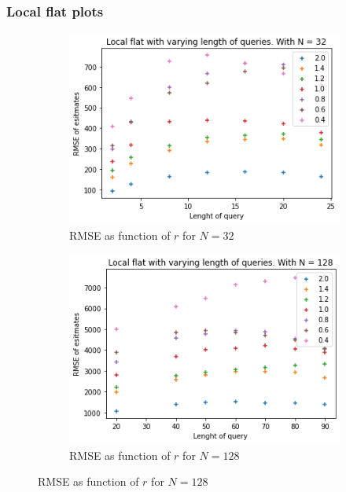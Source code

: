 \documentclass[11pt]{article}
\theoremstyle{definition}
\begin{document}
\subsubsection{Local flat plots}\label{app:loc_r}
\begin{figure}[H]
\centering
\begin{subfigure}{.4\textwidth}
  \centering
  \includegraphics[width=\linewidth]{figures/local_flat/varying_r/loc_flat_varying_length_N=32.png}
  \caption{RMSE as function of $r$ for $N=32$}
  \label{fig:a}
\end{subfigure}%
\begin{subfigure}{.4\textwidth}
  \centering
  \includegraphics[width=\linewidth]{figures/local_flat/varying_r/loc_flat_varying_length_N=128.png}
  \caption{RMSE as function of $r$ for $N=128$}
  \label{fig:a}
\end{subfigure}

\end{figure}
\end{document}
